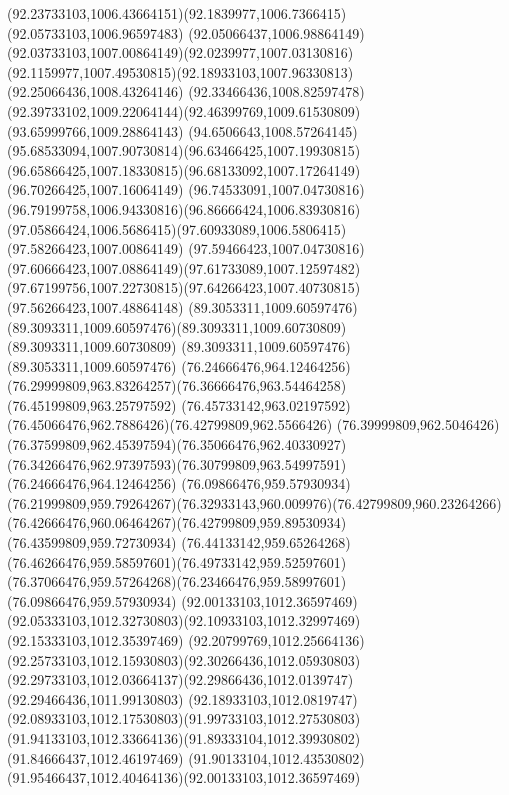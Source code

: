 {{  \curveto(92.23733103,1006.43664151)(92.1839977,1006.7366415)(92.05733103,1006.96597483)
  \curveto(92.05066437,1006.98864149)(92.03733103,1007.00864149)(92.0239977,1007.03130816)
  \curveto(92.1159977,1007.49530815)(92.18933103,1007.96330813)(92.25066436,1008.43264146)
  \curveto(92.33466436,1008.82597478)(92.39733102,1009.22064144)(92.46399769,1009.61530809)
  \lineto(93.65999766,1009.28864143)
  \curveto(94.6506643,1008.57264145)(95.68533094,1007.90730814)(96.63466425,1007.19930815)
  \curveto(96.65866425,1007.18330815)(96.68133092,1007.17264149)(96.70266425,1007.16064149)
  \curveto(96.74533091,1007.04730816)(96.79199758,1006.94330816)(96.86666424,1006.83930816)
  \curveto(97.05866424,1006.5686415)(97.60933089,1006.5806415)(97.58266423,1007.00864149)
  \curveto(97.59466423,1007.04730816)(97.60666423,1007.08864149)(97.61733089,1007.12597482)
  \curveto(97.67199756,1007.22730815)(97.64266423,1007.40730815)(97.56266423,1007.48864148)
  \moveto(89.3053311,1009.60597476)
  \curveto(89.3093311,1009.60597476)(89.3093311,1009.60730809)(89.3093311,1009.60730809)
  \lineto(89.3093311,1009.60597476)
  \lineto(89.3053311,1009.60597476)
  \moveto(76.24666476,964.12464256)
  \curveto(76.29999809,963.83264257)(76.36666476,963.54464258)(76.45199809,963.25797592)
  \curveto(76.45733142,963.02197592)(76.45066476,962.7886426)(76.42799809,962.5566426)
  \curveto(76.39999809,962.5046426)(76.37599809,962.45397594)(76.35066476,962.40330927)
  \curveto(76.34266476,962.97397593)(76.30799809,963.54997591)(76.24666476,964.12464256)
  \moveto(76.09866476,959.57930934)
  \curveto(76.21999809,959.79264267)(76.32933143,960.009976)(76.42799809,960.23264266)
  \curveto(76.42666476,960.06464267)(76.42799809,959.89530934)(76.43599809,959.72730934)
  \curveto(76.44133142,959.65264268)(76.46266476,959.58597601)(76.49733142,959.52597601)
  \curveto(76.37066476,959.57264268)(76.23466476,959.58997601)(76.09866476,959.57930934)
  \moveto(92.00133103,1012.36597469)
  \curveto(92.05333103,1012.32730803)(92.10933103,1012.32997469)(92.15333103,1012.35397469)
  \curveto(92.20799769,1012.25664136)(92.25733103,1012.15930803)(92.30266436,1012.05930803)
  \curveto(92.29733103,1012.03664137)(92.29866436,1012.0139747)(92.29466436,1011.99130803)
  \curveto(92.18933103,1012.0819747)(92.08933103,1012.17530803)(91.99733103,1012.27530803)
  \curveto(91.94133103,1012.33664136)(91.89333104,1012.39930802)(91.84666437,1012.46197469)
  \curveto(91.90133104,1012.43530802)(91.95466437,1012.40464136)(92.00133103,1012.36597469)
}
}
